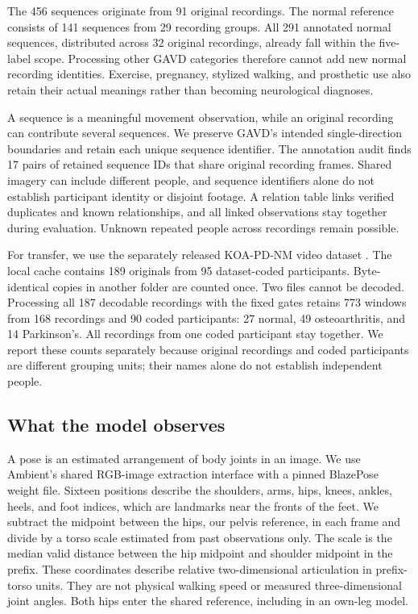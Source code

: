 \documentclass[letterpaper]{article}
\begin{document}
The 456 sequences originate from 91 original recordings. The normal reference consists of 141 sequences from 29 recording groups. All 291 annotated normal sequences, distributed across 32 original recordings, already fall within the five-label scope. Processing other GAVD categories therefore cannot add new normal recording identities. Exercise, pregnancy, stylized walking, and prosthetic use also retain their actual meanings rather than becoming neurological diagnoses.

A sequence is a meaningful movement observation, while an original recording can contribute several sequences. We preserve GAVD's intended single-direction boundaries and retain each unique sequence identifier. The annotation audit finds 17 pairs of retained sequence IDs that share original recording frames. Shared imagery can include different people, and sequence identifiers alone do not establish participant identity or disjoint footage. A relation table links verified duplicates and known relationships, and all linked observations stay together during evaluation. Unknown repeated people across recordings remain possible.

For transfer, we use the separately released KOA-PD-NM video dataset \citep{kour2020,kour2022}. The local cache contains 189 originals from 95 dataset-coded participants. Byte-identical copies in another folder are counted once. Two files cannot be decoded. Processing all 187 decodable recordings with the fixed gates retains 773 windows from 168 recordings and 90 coded participants: 27 normal, 49 osteoarthritis, and 14 Parkinson's. All recordings from one coded participant stay together. We report these counts separately because original recordings and coded participants are different grouping units; their names alone do not establish independent people.

\subsection{What the model observes}

A pose is an estimated arrangement of body joints in an image. We use Ambient's shared RGB-image extraction interface with a pinned BlazePose weight file. Sixteen positions describe the shoulders, arms, hips, knees, ankles, heels, and foot indices, which are landmarks near the fronts of the feet. We subtract the midpoint between the hips, our pelvis reference, in each frame and divide by a torso scale estimated from past observations only. The scale is the median valid distance between the hip midpoint and shoulder midpoint in the prefix. These coordinates describe relative two-dimensional articulation in prefix-torso units. They are not physical walking speed or measured three-dimensional joint angles. Both hips enter the shared reference, including in an own-leg model.
\end{document}
